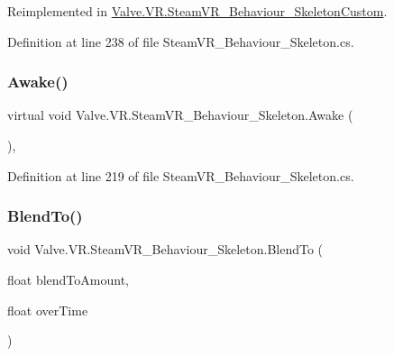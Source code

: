 Reimplemented in \mbox{\hyperlink{class_valve_1_1_v_r_1_1_steam_v_r___behaviour___skeleton_custom_a5184aa62aa3f49cd99d826ca0a71bc87}{Valve.\+V\+R.\+Steam\+V\+R\+\_\+\+Behaviour\+\_\+\+Skeleton\+Custom}}.



Definition at line 238 of file Steam\+V\+R\+\_\+\+Behaviour\+\_\+\+Skeleton.\+cs.

\mbox{\label{class_valve_1_1_v_r_1_1_steam_v_r___behaviour___skeleton_a9c5e89540853309a1fa6bc4bca0e33b7}} 
\subsubsection{\texorpdfstring{Awake()}{Awake()}}
{\footnotesize\ttfamily virtual void Valve.\+V\+R.\+Steam\+V\+R\+\_\+\+Behaviour\+\_\+\+Skeleton.\+Awake (\begin{DoxyParamCaption}{ }\end{DoxyParamCaption})\hspace{0.3cm}{\ttfamily [protected]}, {\ttfamily [virtual]}}



Definition at line 219 of file Steam\+V\+R\+\_\+\+Behaviour\+\_\+\+Skeleton.\+cs.

\mbox{\label{class_valve_1_1_v_r_1_1_steam_v_r___behaviour___skeleton_abb429a927ec527cef6c9f637eaa725e8}} 
\subsubsection{\texorpdfstring{BlendTo()}{BlendTo()}}
{\footnotesize\ttfamily void Valve.\+V\+R.\+Steam\+V\+R\+\_\+\+Behaviour\+\_\+\+Skeleton.\+Blend\+To (\begin{DoxyParamCaption}\item[{float}]{blend\+To\+Amount,  }\item[{float}]{over\+Time }\end{DoxyParamCaption})}



